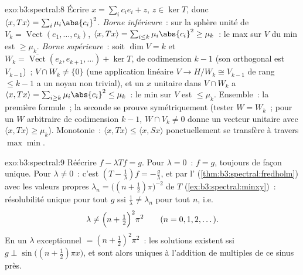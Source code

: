 \begin{solution}{exo:b3:spectral:8}
Écrire $x = \sum_ic_ie_i + z$, $z \in \ker T$, donc $\langle
x, Tx\rangle = \sum_i\mu_i\abs{c_i}^2$. \emph{Borne
inférieure}~: sur la sphère unité de $V_k =
\operatorname{Vect}(e_1, \dots, e_k)$, $\langle x,
Tx\rangle = \sum_{i\leq k}\mu_i\abs{c_i}^2 \geq \mu_k$~: le
max sur $V$ du min est $\geq \mu_k$. \emph{Borne
supérieure}~: soit $\dim V = k$ et $W_k =
\overline{\operatorname{Vect}}(e_k, e_{k+1}, \dots) +
\ker T$, de codimension $k - 1$ (son orthogonal est
$V_{k-1}$)~; $V \cap W_k \neq \{0\}$ (une application
linéaire $V \to H/W_k \cong V_{k-1}$ de rang $\leq k - 1$ a
un noyau non trivial), et un $x$ unitaire dans $V\cap W_k$ a
$\langle x, Tx\rangle = \sum_{i \geq k}\mu_i\abs{c_i}^2 \leq
\mu_k$~: le min sur $V$ est $\leq \mu_k$. Ensemble~: la
première formule~; la seconde se prouve symétriquement
(tester $W = W_k$~; pour un $W$ arbitraire de codimension
$k-1$, $W \cap V_k \neq 0$ donne un vecteur unitaire avec
$\langle x, Tx\rangle \geq \mu_k$). Monotonie~: $\langle x,
Tx\rangle \leq \langle x, Sx\rangle$ ponctuellement se
transfère à travers $\max\min$.
\end{solution}

\begin{solution}{exo:b3:spectral:9}
Réécrire $f - \lambda Tf = g$. Pour $\lambda = 0$~: $f = g$,
toujours  de façon unique. Pour $\lambda \neq 0$~:
c'est $(T - \frac1\lambda)f = -\frac g\lambda$, et par
l' (\cref{thm:b3:spectral:fredholm})
avec les valeurs propres $\lambda_n = \bigl((n +
\frac12)\pi\bigr)^{-2}$ de $T$
(\cref{ex:b3:spectral:minxy})~: résolubilité unique pour tout
$g$ ssi $\frac1\lambda \neq \lambda_n$ pour tout $n$, i.e.
\[
\lambda \neq \Bigl(n + \tfrac12\Bigr)^2\pi^2
\qquad (n = 0, 1, 2, \dots).
\]
En un $\lambda$ exceptionnel $= (n+\frac12)^2\pi^2$~: les
solutions existent ssi $g \perp \sin\bigl((n{+}\frac12)\pi
x\bigr)$, et sont alors uniques à l'addition de multiples de
ce sinus près.
\end{solution}

